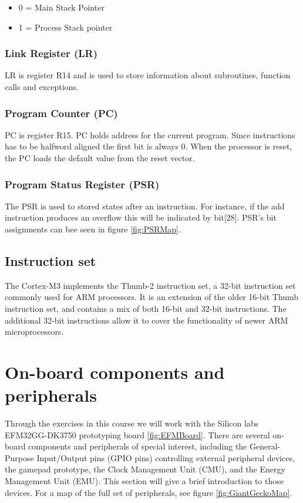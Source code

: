 \begin{itemize}
\item 0 = Main Stack Pointer
\item 1 = Process Stack pointer
\end{itemize}

\subsubsection{Link Register (LR)}
LR is register R14 and is used to store information about subroutines, function calls and exceptions.

\subsubsection{Program Counter (PC)}
PC is register R15. PC holds address for the current program. Since instructions has to be halfword aligned the first bit is always 0. When the processor is reset, the PC loads the default value from the reset vector. 

\subsubsection{Program Status Register (PSR)}
The PSR is used to stored states after an instruction. For instance, if the add instruction produces an overflow this will be indicated by bit[28]. PSR's bit assignments can bee seen in figure \ref{fig:PSRMap}.

\subsection{Instruction set}
The Cortex-M3 implements the Thumb-2 instruction set, a 32-bit instruction set commonly used for ARM processors. It is an extension of the older 16-bit Thumb instruction set, and contains a mix of both 16-bit and 32-bit instructions. The additional 32-bit instructions allow it to cover the functionality of newer ARM microprocessors.\cite{CortexA8-RM}



\section{On-board components and peripherals}

Through the exercises in this course we will work with the Silicon labs EFM32GG-DK3750 prototyping board \ref{fig:EFMBoard}. There are several on-board components and peripherals of special interest, including the General-Purpose Input/Output pins (GPIO pins) controlling external peripheral devices, the gamepad prototype, the Clock Management Unit (CMU), and the Energy Management Unit (EMU). This section will give a brief introduction to those devices. For a map of the full set of peripherals, see figure \ref{fig:GiantGeckoMap}.

